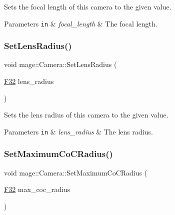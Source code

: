 Sets the focal length of this camera to the given value.


\begin{DoxyParams}[1]{Parameters}
\mbox{\tt in}  & {\em focal\+\_\+length} & The focal length. \\
\hline
\end{DoxyParams}
\hypertarget{classmage_1_1_camera_af507ae56708b3591c174af01295e4071}{}\label{classmage_1_1_camera_af507ae56708b3591c174af01295e4071} 
\subsubsection{\texorpdfstring{Set\+Lens\+Radius()}{SetLensRadius()}}
{\footnotesize\ttfamily void mage\+::\+Camera\+::\+Set\+Lens\+Radius (\begin{DoxyParamCaption}\item[{\hyperlink{namespacemage_aa97e833b45f06d60a0a9c4fc22ae02c0}{F32}}]{lens\+\_\+radius }\end{DoxyParamCaption})\hspace{0.3cm}{\ttfamily [noexcept]}}

Sets the lens radius of this camera to the given value.


\begin{DoxyParams}[1]{Parameters}
\mbox{\tt in}  & {\em lens\+\_\+radius} & The lens radius. \\
\hline
\end{DoxyParams}
\hypertarget{classmage_1_1_camera_a586912018439ff0cbd6ed2d6d9554db4}{}\label{classmage_1_1_camera_a586912018439ff0cbd6ed2d6d9554db4} 
\subsubsection{\texorpdfstring{Set\+Maximum\+Co\+C\+Radius()}{SetMaximumCoCRadius()}}
{\footnotesize\ttfamily void mage\+::\+Camera\+::\+Set\+Maximum\+Co\+C\+Radius (\begin{DoxyParamCaption}\item[{\hyperlink{namespacemage_aa97e833b45f06d60a0a9c4fc22ae02c0}{F32}}]{max\+\_\+coc\+\_\+radius }\end{DoxyParamCaption})\hspace{0.3cm}{\ttfamily [noexcept]}}

